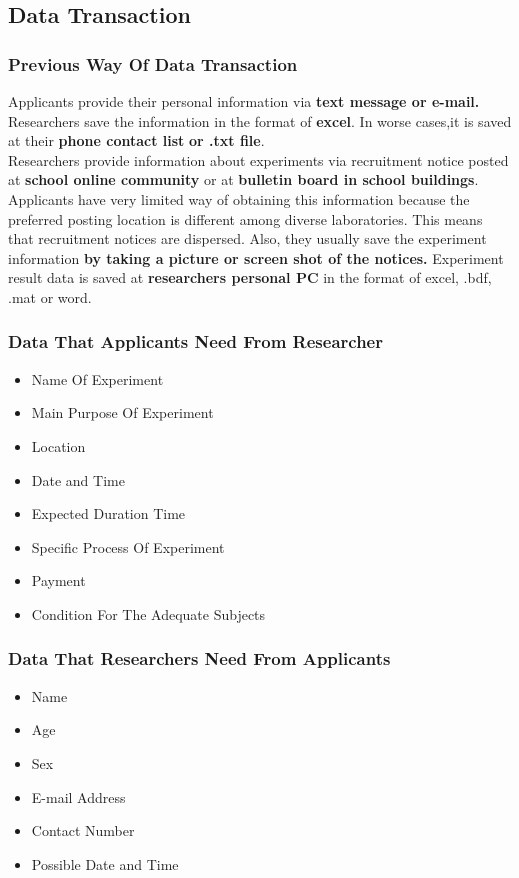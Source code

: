 \documentclass[letterpaper, 10 pt, conference]{ieeeconf}  %
\begin{document}
\subsection{Data Transaction\\}

\subsubsection{Previous Way Of Data Transaction}
Applicants provide their personal information via \textbf{text message or e-mail.} 
Researchers save the information in the format of \textbf{excel}. In worse cases,it is saved at their \textbf{phone contact list}\textbf{ or .txt file}.\\
Researchers provide information about experiments via recruitment notice posted at \textbf{school online community} or at \textbf{bulletin board in school buildings}. Applicants have very limited way of obtaining this information because the preferred posting location is different among diverse laboratories. This means that recruitment notices are dispersed. Also, they usually save the experiment information \textbf{by taking a picture or screen shot of the notices.}
Experiment result data is saved at \textbf{researchers personal PC} in the format of excel, .bdf, .mat or word.\\

\subsubsection{\textbf{Data That Applicants Need From Researcher}\\}
\begin{itemize}
\item Name Of Experiment
\item Main Purpose Of Experiment
\item Location
\item Date and Time 
\item Expected Duration Time
\item Specific Process Of Experiment
\item Payment
\item Condition For The Adequate Subjects\\
\end{itemize}



\subsubsection{\textbf{Data That Researchers Need From Applicants\\}}
\begin{itemize}
\item Name
\item Age
\item Sex
\item E-mail Address
\item Contact Number
\item Possible Date and Time\\
\end{itemize}
\end{document}
